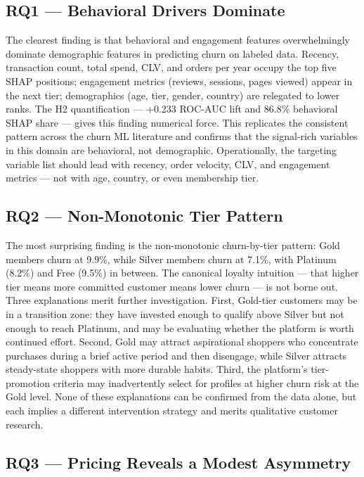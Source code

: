 \documentclass[conference]{IEEEtran}
\begin{document}
\subsection{RQ1 — Behavioral Drivers Dominate}

The clearest finding is that behavioral and engagement features overwhelmingly dominate demographic features in predicting churn on labeled data. Recency, transaction count, total spend, CLV, and orders per year occupy the top five SHAP positions; engagement metrics (reviews, sessions, pages viewed) appear in the next tier; demographics (age, tier, gender, country) are relegated to lower ranks. The H2 quantification — +0.233 ROC-AUC lift and 86.8\% behavioral SHAP share — gives this finding numerical force. This replicates the consistent pattern across the churn ML literature \cite{ahmad2019,decaigny2018} and confirms that the signal-rich variables in this domain are behavioral, not demographic. Operationally, the targeting variable list should lead with recency, order velocity, CLV, and engagement metrics — not with age, country, or even membership tier.

\subsection{RQ2 — Non-Monotonic Tier Pattern}

The most surprising finding is the non-monotonic churn-by-tier pattern: Gold members churn at 9.9\%, while Silver members churn at 7.1\%, with Platinum (8.2\%) and Free (9.5\%) in between. The canonical loyalty intuition — that higher tier means more committed customer means lower churn — is not borne out. Three explanations merit further investigation. First, Gold-tier customers may be in a transition zone: they have invested enough to qualify above Silver but not enough to reach Platinum, and may be evaluating whether the platform is worth continued effort. Second, Gold may attract aspirational shoppers who concentrate purchases during a brief active period and then disengage, while Silver attracts steady-state shoppers with more durable habits. Third, the platform's tier-promotion criteria may inadvertently select for profiles at higher churn risk at the Gold level. None of these explanations can be confirmed from the data alone, but each implies a different intervention strategy and merits qualitative customer research.

\subsection{RQ3 — Pricing Reveals a Modest Asymmetry}
\end{document}
